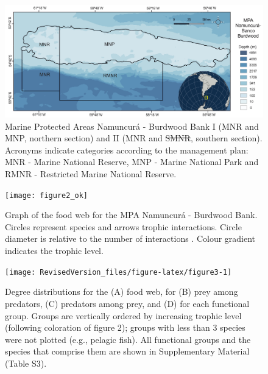 \documentclass[
]{article}
\providecommand{\DIFadd}[1]{{\protect\color{blue}\uwave{#1}}} %
\providecommand{\DIFdel}[1]{{\protect\color{red}\sout{#1}}}                      %
\providecommand{\DIFaddFL}[1]{\DIFadd{#1}} %
\providecommand{\DIFdelFL}[1]{\DIFdel{#1}} %
\providecommand{\DIFaddbeginFL}{} %
\providecommand{\DIFaddendFL}{} %
\providecommand{\DIFdelbeginFL}{} %
\providecommand{\DIFdelendFL}{} %
\newcommand{\DIFscaledelfig}{0.5}
\newlength{\DIFdelgraphicswidth} %
\newlength{\DIFdelgraphicsheight} %
\newcommand{\DIFaddincludegraphics}[2][]{{\color{blue}\fbox{\DIFOincludegraphics[#1]{#2}}}} %
\newcommand{\DIFdelincludegraphics}[2][]{%
\sbox{\DIFdelgraphicsbox}{\DIFOincludegraphics[#1]{#2}}%
\settoboxwidth{\DIFdelgraphicswidth}{\DIFdelgraphicsbox} %
\settoboxtotalheight{\DIFdelgraphicsheight}{\DIFdelgraphicsbox} %
\scalebox{\DIFscaledelfig}{%
\parbox[b]{\DIFdelgraphicswidth}{\usebox{\DIFdelgraphicsbox}\\[-\baselineskip] \rule{\DIFdelgraphicswidth}{0em}}\llap{\resizebox{\DIFdelgraphicswidth}{\DIFdelgraphicsheight}{%
\setlength{\unitlength}{\DIFdelgraphicswidth}%
\begin{picture}(1,1)%
\thicklines\linethickness{2pt} %
{\color[rgb]{1,0,0}\put(0,0){\framebox(1,1){}}}%
{\color[rgb]{1,0,0}\put(0,0){\line( 1,1){1}}}%
{\color[rgb]{1,0,0}\put(0,1){\line(1,-1){1}}}%
\end{picture}%
}\hspace*{3pt}}} %
} %
\DeclareRobustCommand{\DIFaddbeginFL}{\DIFOaddbeginFL \let\includegraphics\DIFaddincludegraphics} %
\DeclareRobustCommand{\DIFaddendFL}{\DIFOaddendFL \let\includegraphics\DIFOincludegraphics} %
\DeclareRobustCommand{\DIFdelbeginFL}{\DIFOdelbeginFL \let\includegraphics\DIFdelincludegraphics} %
\DeclareRobustCommand{\DIFdelendFL}{\DIFOaddendFL \let\includegraphics\DIFOincludegraphics} %
\begin{document}
\begin{figure}
\includegraphics[width=1\linewidth]{MPABurdwood_map} \caption{Marine Protected Areas Namuncurá - Burdwood Bank I (MNR and MNP, northern section) and II (MNR and \DIFdelbeginFL \DIFdelFL{SMNR}\DIFdelendFL \DIFaddbeginFL \DIFaddFL{RMNR}\DIFaddendFL , southern section). Acronyms indicate categories according to the management plan: MNR - Marine National Reserve, MNP - Marine National Park and RMNR - Restricted Marine National Reserve.}\label{fig:figure1}
\end{figure}

\begin{figure}

{\centering \DIFdelbeginFL %
\DIFdelendFL \DIFaddbeginFL \texttt{[image: figure2\_ok]} 
\DIFaddendFL 

}

\caption{Graph of the food web for the MPA Namuncurá - Burdwood Bank. Circles represent \DIFaddbeginFL \DIFaddFL{trophic }\DIFaddendFL species and arrows trophic interactions. Circle diameter is relative to the number of interactions \DIFaddbeginFL \DIFaddFL{(see legend)}\DIFaddendFL . Colour gradient indicates the trophic level.}\label{fig:figure2}
\end{figure}

\begin{figure}

{\centering \DIFdelbeginFL %
\DIFdelendFL \DIFaddbeginFL \texttt{[image: RevisedVersion\_files/figure-latex/figure3-1]} 
\DIFaddendFL 

}

\caption{Degree distributions for the (A) food web, for (B) prey among predators, (C) predators among prey, and (D) for each functional group. Groups are vertically ordered by increasing trophic level (following coloration of figure 2); groups with less than 3 species were not plotted (e.g., pelagic fish). All functional groups and the species that comprise them are shown in Supplementary Material (Table S3).}\label{fig:figure3}
\end{figure}
\end{document}
